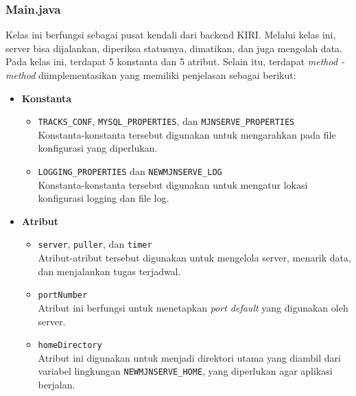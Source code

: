 \subsubsection{Main.java}
Kelas ini berfungsi sebagai pusat kendali dari backend KIRI. Melalui kelas ini, server bisa dijalankan, diperiksa statusnya, dimatikan, dan juga mengolah data. Pada kelas ini, terdapat 5 konstanta dan 5 atribut. Selain itu, terdapat \textit{method - method} diimplementasikan yang memiliki penjelasan sebagai berikut:
\begin{itemize}
    \item \textbf{Konstanta}
    \begin{itemize}
        \item \texttt{TRACKS\_CONF}, \texttt{MYSQL\_PROPERTIES}, dan \texttt{MJNSERVE\_PROPERTIES}
        \\ Konstanta-konstanta tersebut digunakan untuk mengarahkan pada file konfigurasi yang diperlukan.
        \item \texttt{LOGGING\_PROPERTIES} dan \texttt{NEWMJNSERVE\_LOG}
        \\ Konstanta-konstanta tersebut digunakan untuk mengatur lokasi konfigurasi logging dan file log.
    \end{itemize}

    \item \textbf{Atribut}
    \begin{itemize}
        \item \texttt{server}, \texttt{puller}, dan \texttt{timer}
        \\ Atribut-atribut tersebut digunakan untuk mengelola server, menarik data, dan menjalankan tugas terjadwal.
        \item \texttt{portNumber}
        \\ Atribut ini berfungsi untuk menetapkan \textit{port default} yang digunakan oleh server.
        \item \texttt{homeDirectory}
        \\ Atribut ini digunakan untuk menjadi direktori utama yang diambil dari variabel lingkungan \texttt{NEWMJNSERVE\_HOME}, yang diperlukan agar aplikasi berjalan.
    \end{itemize}


\end{itemize}
